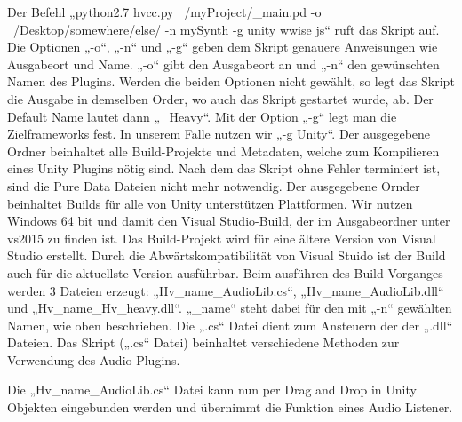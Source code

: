 \documentclass[a4paper, 11pt]{scrartcl}
\begin{document}
Der Befehl „python2.7 hvcc.py ~/myProject/\_main.pd -o ~/Desktop/somewhere/else/
-n mySynth -g unity wwise js“ ruft das Skript auf. Die Optionen „-o“, „-n“ und
„-g“ geben dem Skript genauere Anweisungen wie Ausgabeort und Name.  „-o“ gibt
den Ausgabeort an und „-n“ den gewünschten Namen des Plugins. Werden die beiden
Optionen nicht gewählt, so legt das Skript die Ausgabe in demselben Order, wo
auch das Skript gestartet wurde, ab. Der Default Name lautet dann „\_Heavy“. Mit
der Option „-g“ legt man die Zielframeworks fest. In unserem Falle nutzen wir
„-g Unity“. Der ausgegebene Ordner beinhaltet alle Build-Projekte und Metadaten,
welche zum Kompilieren eines Unity Plugins nötig sind. Nach dem das Skript ohne
Fehler terminiert ist, sind die Pure Data Dateien nicht mehr notwendig. Der
ausgegebene Ornder beinhaltet Builds für alle von Unity unterstützen
Plattformen. Wir nutzen Windows 64 bit und damit den Visual Studio-Build, der im
Ausgabeordner unter vs2015 zu finden ist. Das Build-Projekt wird für eine ältere
Version von Visual Studio erstellt. Durch die Abwärtskompatibilität von Visual
Stuido ist der Build auch für die aktuellste Version ausführbar.  Beim ausführen
des Build-Vorganges werden 3 Dateien erzeugt: „Hv\_name\_AudioLib.cs“,
„Hv\_name\_AudioLib.dll“ und „Hv\_name\_Hv\_heavy.dll“.  „\_name“ steht dabei
für den mit „-n“ gewählten Namen, wie oben beschrieben.  Die „.cs“ Datei dient
zum Ansteuern der der „.dll“ Dateien. Das Skript („.cs“ Datei) beinhaltet
verschiedene Methoden zur Verwendung des Audio Plugins. 

Die „Hv\_name\_AudioLib.cs“ Datei kann nun per Drag and Drop in Unity Objekten
eingebunden werden und übernimmt die Funktion eines Audio Listener.
\end{document}
